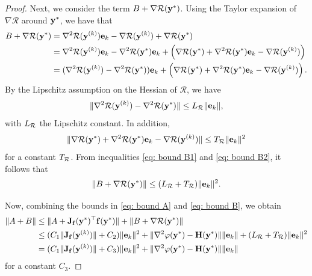 \documentclass[onefignum,onetabnum]{siamart171218}
\newcommand{\bH}{{\bf H}}
\newcommand{\bJ}{{\bf J}}
\newcommand{\be}{{\bf e}}
\newcommand{\bff}{{\bf f}}
\newcommand{\by}{{\bf y}}
\begin{document}
\begin{proof}
Next, we consider the term $B+ \nabla \mathcal{R}(\by^{*})$. Using the Taylor expansion of $\nabla \mathcal{R}$ around $\by^*$, we have that
\begin{align*}
B + \nabla \mathcal{R}(\by^*)  & = \nabla^2 \mathcal{R}(\by^{(k)})\be_k - \nabla \mathcal{R}(\by^{(k)}) +\nabla \mathcal{R}(\by^*)  \\
&=  \nabla^2 \mathcal{R}(\by^{(k)}) \be_k   - \nabla^2 \mathcal{R}(\by^*)\be_k +\left(\nabla \mathcal{R}(\by^*) + \nabla^2 \mathcal{R}(\by^*)\be_k - \nabla \mathcal{R}(\by^{(k)}) \right) \\
&=  (\nabla^2 \mathcal{R}(\by^{(k)}) -\nabla^2 \mathcal{R}(\by^*))\be_k +\left(\nabla \mathcal{R}(\by^*) + \nabla^2 \mathcal{R}(\by^*)\be_k - \nabla \mathcal{R}(\by^{(k)}) \right).
\end{align*}
By the Lipschitz assumption on the Hessian of $\mathcal{R}$, we have
\begin{equation}\label{eq: bound B1}
\| \nabla^2 \mathcal{R}(\by^{(k)}) -\nabla^2 \mathcal{R}(\by^*)\| \le L_{\cal R} \| \be_k\|,
\end{equation}
with $L_{\cal R}$ the Lipschitz constant. In addition, 
\begin{equation}\label{eq: bound B2}
\|\nabla \mathcal{R}(\by^*) + \nabla^2 \mathcal{R}(\by^*)\be_k - \nabla \mathcal{R}(\by^{(k)}) \|\le T_{\cal R} \| \be_k\|^2
\end{equation}
for a constant $T_{\cal R}$. From inequalities \eqref{eq: bound B1} and \eqref{eq: bound B2}, it follows that
\begin{equation}\label{eq: bound B}
\| B+ \nabla \mathcal{R}(\by^*)\| \le (L_{\cal R}+ T_{\cal R}) \| \be_k\|^2.
\end{equation}

Now, combining the bounds in \eqref{eq: bound A} and \eqref{eq: bound B}, we obtain
\begin{align*}
\| A+B\| &\le 
\|A+\bJ_{\bf f}(\by^*)^\top \bff(\by^*) \|+ \|B+\nabla \mathcal{R}(\by^*) \| \\
&\le (C_1 \| \bJ_{\bf f}(\by^{(k)})\| + C_2)\|\be_{k}\|^2 + \|\nabla^2 \varphi(\by^*) - \bH(\by^*)\| \|\be_{k}\| + (L_{\cal R}+ T_{\cal R}) \| \be_k\|^2 \\
&=(C_1 \| \bJ_{\bf f}(\by^{(k)})\| + C_3 )\|\be_{k}\|^2 +  \|\nabla^2 \varphi(\by^*) - \bH(\by^*)\| \|\be_{k}\|
\end{align*}
for a constant $C_3$.


\end{proof}
\end{document}

